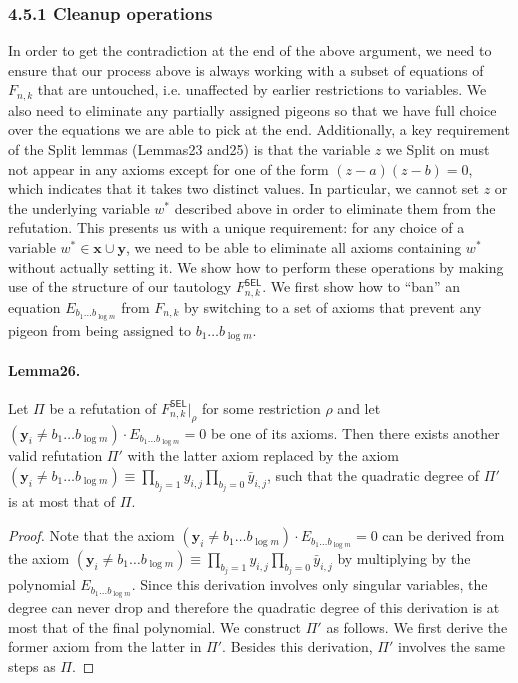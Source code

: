 \documentclass[10pt,a4paper]{article}
\begin{document}
\subsubsection*{4.5.1 Cleanup operations}
In order to get the contradiction at the end of the above argument, we need to ensure that our process above is always working with a subset of equations of $F_{n,k}$ that are untouched, i.e. unaffected by earlier restrictions to variables. We also need to eliminate any partially assigned pigeons so that we have full choice over the equations we are able to pick at the end. Additionally, a key requirement of the Split lemmas (Lemmas23 and25) is that the variable $z$ we Split on must not appear in any axioms except for one of the form $(z-a)(z-b)=0$, which indicates that it takes two distinct values. In particular, we cannot set $z$ or the underlying variable $w^*$ described above in order to eliminate them from the refutation. This presents us with a unique requirement: for any choice of a variable $w^*\in\mathbf x\cup\mathbf y$, we need to be able to eliminate all axioms containing $w^*$ without actually setting it. We show how to perform these operations by making use of the structure of our tautology $F^{\mathsf{SEL}}_{n,k}$.
We first show how to ``ban'' an equation $E_{b_1\ldots b_{\log m}}$ from $F_{n,k}$ by switching to a set of axioms that prevent any pigeon from being assigned to $b_1\ldots b_{\log m}$.
\paragraph{Lemma26.} Let $\Pi$ be a refutation of $F^{\mathsf{SEL}}_{n,k}|_{\rho}$ for some restriction $\rho$ and let $(\mathbf y_i\neq b_1\ldots b_{\log m})\cdot E_{b_1\ldots b_{\log m}}=0$ be one of its axioms. Then there exists another valid refutation $\Pi'$ with the latter axiom replaced by the axiom $(\mathbf y_i\neq b_1\ldots b_{\log m})\equiv\prod_{b_j=1}y_{i,j}\prod_{b_j=0}\bar y_{i,j}$, such that the quadratic degree of $\Pi'$ is at most that of $\Pi$.
\begin{proof}
Note that the axiom $(\mathbf y_i\neq b_1\ldots b_{\log m})\cdot E_{b_1\ldots b_{\log m}}=0$ can be derived from the axiom $(\mathbf y_i\neq b_1\ldots b_{\log m})\equiv\prod_{b_j=1}y_{i,j}\prod_{b_j=0}\bar y_{i,j}$ by multiplying by the polynomial $E_{b_1\ldots b_{\log m}}$. Since this derivation involves only singular variables, the degree can never drop and therefore the quadratic degree of this derivation is at most that of the final polynomial. We construct $\Pi'$ as follows. We first derive the former axiom from the latter in $\Pi'$. Besides this derivation, $\Pi'$ involves the same steps as $\Pi$.
\end{proof}
\end{document}
